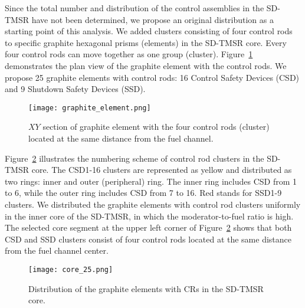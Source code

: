 Since the total number and distribution of the control assemblies in the SD-TMSR have not been determined, we propose an original distribution as a starting point of this analysis. We added clusters consisting of four control rods to specific graphite hexagonal prisms (elements) in the SD-TMSR core. Every four control rods can move together as one group (cluster). Figure~\ref{fig:graphite_elemen} demonstrates the plan view of the graphite element with the control rods. We propose 25 graphite elements with control rods: 16 Control Safety Devices (CSD) and 9 Shutdown Safety Devices (SSD).

\begin{figure}[t!]  %
	\centering
	\hspace{+0.65in}
	\texttt{[image: graphite\_element.png]}
	\caption{$XY$ section of graphite element with the four control rods 
	(cluster) located at the same distance from the fuel channel.}
	\label{fig:graphite_elemen}
\end{figure}

Figure~\ref{fig:core_25} illustrates the numbering scheme of control rod 
clusters in the SD-TMSR core.
The CSD1-16 clusters are represented as yellow and distributed as two rings: inner and outer (peripheral) ring. The inner ring includes CSD from 1 to 6, while the outer ring includes CSD from 7 to 16. Red stands for SSD1-9 clusters.
We distributed the graphite elements with control rod clusters uniformly in 
the inner core of the SD-TMSR, in which the moderator-to-fuel ratio is high.
The selected core segment at the upper left corner of 
Figure~\ref{fig:core_25} shows that both CSD and SSD clusters consist of four 
control rods located at the same distance from the fuel channel center.
\begin{figure}[t!]  %
	\centering
	\hspace{+0.65in}
	\texttt{[image: core\_25.png]}
	\caption{Distribution of the graphite elements with CRs in the SD-TMSR core.}
	\label{fig:core_25}
\end{figure}

